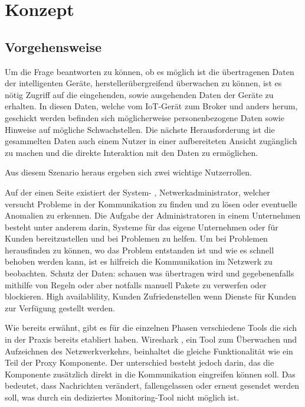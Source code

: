 \chapter{Konzept}
\section{Vorgehensweise}
    Um die Frage beantworten zu können, ob es möglich ist die übertragenen Daten der intelligenten Geräte, herstellerübergreifend überwachen zu können, ist es nötig Zugriff auf die eingehenden, sowie ausgehenden Daten der Geräte zu erhalten. In diesen Daten, welche vom \ac{IoT}-Gerät zum Broker und anders herum, geschickt werden befinden sich möglicherweise personenbezogene Daten sowie Hinweise auf mögliche Schwachstellen.
    Die nächste Herausforderung ist die gesammelten Daten auch einem Nutzer in einer aufbereiteten Ansicht zugänglich zu machen und die direkte Interaktion mit den Daten zu ermöglichen.

    Aus diesem Szenario heraus ergeben sich zwei wichtige Nutzerrollen.
    
    Auf der einen Seite existiert der System- , Netwerkadministrator, welcher versucht Probleme in der Kommunikation zu finden und zu lösen oder eventuelle Anomalien zu erkennen.
    Die Aufgabe der Administratoren in einem Unternehmen besteht unter anderem darin, Systeme für das eigene Unternehmen oder für Kunden bereitzustellen und bei Problemen zu helfen. Um bei Problemen herausfinden zu können, wo das Problem entstanden ist und wie es schnell behoben werden kann, ist es hilfreich die Kommunikation im Netzwerk zu beobachten.
    Schutz der Daten: schauen was übertragen wird und gegebenenfalls mithilfe von Regeln oder aber notfalls manuell Pakete zu verwerfen oder blockieren.
    High availablility, Kunden Zufriedenstellen wenn Dienste für Kunden zur Verfügung gestellt werden.
    
    
    Wie bereits erwähnt, gibt es für die einzelnen Phasen verschiedene Tools die sich in der Praxis bereits etabliert haben.
    Wireshark \cite{SandersChris2017Ppa} %
    , ein Tool zum Überwachen und Aufzeichnen des Netzwerkverkehrs, beinhaltet die gleiche Funktionalität wie ein Teil der Proxy Komponente. Der unterschied besteht jedoch darin, das die Komponente zusätzlich direkt in die Kommunikation eingreifen können soll. Das bedeutet, dass Nachrichten verändert, fallengelassen oder erneut gesendet werden soll, was durch ein dediziertes Monitoring-Tool nicht möglich ist.
    
